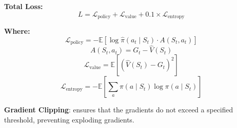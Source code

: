\documentclass[aspectratio=169,xcolor=dvipsnames]{beamer}
\begin{document}
%
%

\begin{frame}{}
    \textbf{Total Loss:}
    \[
    L = \mathcal{L}_{\text{policy}} + \mathcal{L}_{\text{value}} + 0.1 \times \mathcal{L}_{\text{entropy}}
    \]

    \vspace{0.3cm}
    \textbf{Where:}
    \[
    \mathcal{L}_{\text{policy}} = - \mathbb{E} \left[ \log \hat{\pi}(a_t \mid S_t) \cdot A(S_t, a_t)  \right]
    \]
    \[
    A(S_t, a_t) = G_t - \hat{V}(S_t)
    \]
    \[
    \mathcal{L}_{\text{value}} = \mathbb{E} \left[ \left( \hat{V}(S_t) - G_t \right)^2  \right]
    \]
    \[
    \mathcal{L}_{\text{entropy}} = - \mathbb{E} \left[ \sum_a \pi(a \mid S_t) \log \pi(a \mid S_t)  \right]
    \]

    \textbf{Gradient Clipping}: ensures that the gradients do not exceed a specified threshold, preventing exploding gradients.
\end{frame}
\end{document}
